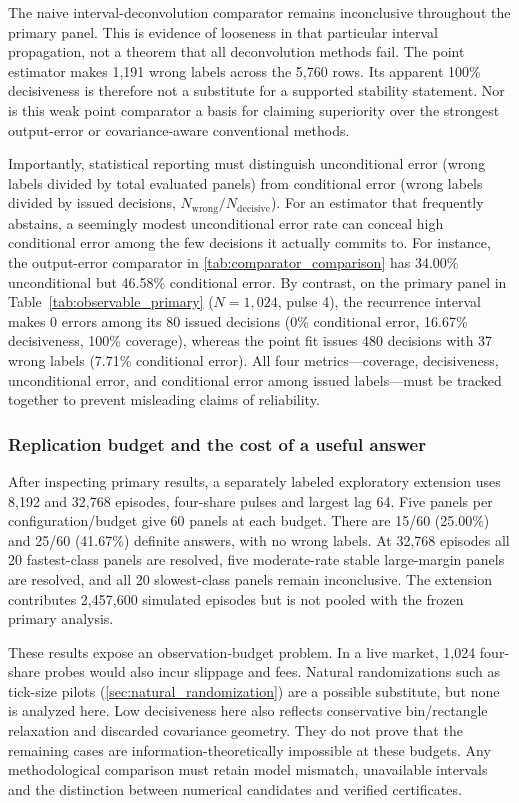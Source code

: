 \documentclass[10pt,twocolumn,letterpaper]{article}
\theoremstyle{definition}
\theoremstyle{remark}
\begin{document}
The naive interval-deconvolution comparator remains inconclusive throughout the primary panel. This is evidence of looseness in that particular interval propagation, not a theorem that all deconvolution methods fail. The point estimator makes 1,191 wrong labels across the 5,760 rows. Its apparent 100\% decisiveness is therefore not a substitute for a supported stability statement. Nor is this weak point comparator a basis for claiming superiority over the strongest output-error or covariance-aware conventional methods.

Importantly, statistical reporting must distinguish unconditional error (wrong labels divided by total evaluated panels) from conditional error (wrong labels divided by issued decisions, $N_{\mathrm{wrong}}/N_{\mathrm{decisive}}$). For an estimator that frequently abstains, a seemingly modest unconditional error rate can conceal high conditional error among the few decisions it actually commits to. For instance, the output-error comparator in \cref{tab:comparator_comparison} has 34.00\% unconditional but 46.58\% conditional error. By contrast, on the primary panel in Table~\ref{tab:observable_primary} ($N=1,024$, pulse 4), the recurrence interval makes 0 errors among its 80 issued decisions (0\% conditional error, 16.67\% decisiveness, 100\% coverage), whereas the point fit issues 480 decisions with 37 wrong labels (7.71\% conditional error). All four metrics---coverage, decisiveness, unconditional error, and conditional error among issued labels---must be tracked together to prevent misleading claims of reliability.

\subsubsection{Replication budget and the cost of a useful answer}
After inspecting primary results, a separately labeled exploratory extension uses 8,192 and 32,768 episodes, four-share pulses and largest lag 64. Five panels per configuration/budget give 60 panels at each budget. There are 15/60 (25.00\%) and 25/60 (41.67\%) definite answers, with no wrong labels. At 32,768 episodes all 20 fastest-class panels are resolved, five moderate-rate stable large-margin panels are resolved, and all 20 slowest-class panels remain inconclusive. The extension contributes 2,457,600 simulated episodes but is not pooled with the frozen primary analysis.

These results expose an observation-budget problem. In a live market, 1,024 four-share probes would also incur slippage and fees. Natural randomizations such as tick-size pilots (\cref{sec:natural_randomization}) are a possible substitute, but none is analyzed here. Low decisiveness here also reflects conservative bin/rectangle relaxation and discarded covariance geometry. They do not prove that the remaining cases are information-theoretically impossible at these budgets. Any methodological comparison must retain model mismatch, unavailable intervals and the distinction between numerical candidates and verified certificates.
\end{document}
